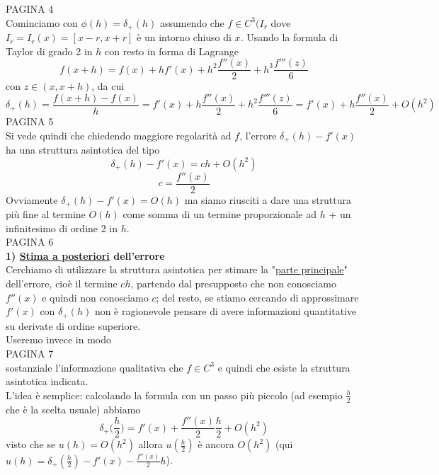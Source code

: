\documentclass[12pt,a4paper]{article}
\begin{document}
PAGINA 4\\%
Cominciamo con $\phi(h)=\delta_+(h)$ assumendo che $f\in C^3(I_r$ dove $I_r=I_r(x)=[x-r,x+r]$ è un intorno chiuso di $x$. Usando la formula di Taylor di grado 2 in $h$ con resto in forma di Lagrange
\begin{equation*}
    f(x+h)=f(x)+hf'(x)+h^2\frac{f''(x)}{2}+h^3\frac{f'''(z)}{6}
\end{equation*}
con $z\in (x,x+h)$, da cui 
\begin{equation*}
    \delta_+(h)=\frac{f(x+h)-f(x)}{h}=f'(x)+h\frac{f''(x)}{2}+h^2\frac{f'''(z)}{6}=f'(x)+h\frac{f''(x)}{2}+O(h^2)
\end{equation*}
PAGINA 5\\%
Si vede quindi che chiedendo maggiore regolarità ad $f$, l'errore $\delta_+(h)-f'(x)$ ha una struttura asintotica del tipo
\begin{equation*}
    \delta_+(h)-f'(x)=ch+O(h^2)
\end{equation*}
\begin{equation*}
    c=\frac{f''(x)}{2}
\end{equation*}
Ovviamente $\delta_+(h)-f'(x)=O(h)$ ma siamo riusciti a dare una struttura più fine al termine $O(h)$ come somma di un termine proporzionale ad $h$ + un infinitesimo di ordine 2 in $h$.\\
PAGINA 6\\%
\textbf{1) \underline{Stima a posteriori} dell'errore}
\\Cerchiamo di utilizzare la struttura asintotica per stimare la "\underline{parte principale}" dell'errore, cioè il termine $ch$, partendo dal presupposto che non conosciamo $f''(x)$ e quindi non conosciamo $c$; del resto, se stiamo cercando di approssimare $f'(x)$ con $\delta_+(h)$ non è ragionevole pensare di avere informazioni quantitative su derivate di ordine superiore.\\Useremo invece in modo\\
PAGINA 7\\%
sostanziale l'informazione qualitativa che $f\in C^3$ e quindi che esiste la struttura asintotica indicata.\\L'idea è semplice: calcolando la formula con un passo più piccolo (ad esempio $\frac{h}{2}$ che è la scelta usuale) abbiamo 
\begin{equation*}
    \delta_+\biggl(\frac{h}{2}\biggr)=f'(x)+\frac{f''(x)}{2}\frac{h}{2}+O(h^2)
\end{equation*}
visto che se $u(h)=O(h^2)$ allora $u(\frac{h}{2})$ è ancora $O(h^2)$ (qui $u(h)=\delta_+(\frac{h}{2})-f'(x)-\frac{f''(x)}{2}h$).\\
\end{document}
